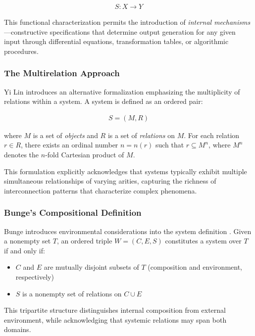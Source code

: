 \begin{align*}
S: X \to Y
\end{align*}

This functional characterization permits the introduction of \emph{internal mechanisms}---constructive specifications that determine output generation for any given input through differential equations, transformation tables, or algorithmic procedures.

\subsubsection{The Multirelation Approach}

Yi Lin \citep{Lin1999} introduces an alternative formalization emphasizing the multiplicity of relations within a system. A system is defined as an ordered pair:

\begin{align*}
S = (M, R)
\end{align*}

where $M$ is a set of \emph{objects} and $R$ is a set of \emph{relations} on $M$. For each relation $r \in R$, there exists an ordinal number $n = n(r)$ such that $r \subseteq M^n$, where $M^n$ denotes the $n$-fold Cartesian product of $M$.

This formulation explicitly acknowledges that systems typically exhibit multiple simultaneous relationships of varying arities, capturing the richness of interconnection patterns that characterize complex phenomena.

\subsubsection{Bunge's Compositional Definition}

Bunge introduces environmental considerations into the system definition \citep[as cited in][]{Lin1999,Bunge1979}. Given a nonempty set $T$, an ordered triple $W = (C, E, S)$ constitutes a system over $T$ if and only if:

\begin{itemize}
\item $C$ and $E$ are mutually disjoint subsets of $T$ (composition and environment, respectively)
\item $S$ is a nonempty set of relations on $C \cup E$
\end{itemize}

This tripartite structure distinguishes internal composition from external environment, while acknowledging that systemic relations may span both domains.